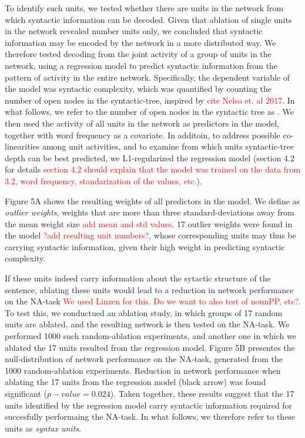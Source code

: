 To identify such units, we tested whether there are units in the network from which syntactic information can be decoded. Given that ablation of single units in the network revealed number units only, we concluded that syntactic information may be encoded by the network in a more distributed way. We therefore tested decoding from the joint activity of a group of units in the network, using a regression model to predict syntactic information from the pattern of activity in the entire network. Specifically, the dependent variable of the model was syntactic complexity, which was quantified by counting the number of open nodes in the syntactic-tree, inspired by \textcolor{red}{cite Nelso et. al 2017}. In what follows, we refer to the number of open nodes in the syntactic tree as . We then used the activity of all units in the network as predictors in the model, together with word frequency as a covariate. In additoin, to address possible co-linearities among unit activities, and to examine from which units syntactic-tree depth can be best predicted, we L1-regularized the regression model (section 4.2 for details \textcolor{red}{section 4.2 should explain that the model was trained on the data from 3.2, word frequency, standarization of the values, etc.}). 

Figure 5A shows the resulting weights of all predictors in the model. We define as \textit{outlier weights}, weights that are more than three standard-deviations away from the mean weight size \textcolor{red}{add mean and std values}. 17 outlier weights were found in the model \textcolor{red}{?add resulting unit numbers?}, whose corresponding units may thus be carrying syntactic information, given their high weight in predicting syntactic complexity. 

If these units indeed carry information about the sytactic structure of the sentence, ablating these units would lead to a reduction in network performance on the NA-task \textcolor{red}{We used Linzen for this. Do we want to also test of nounPP, etc?}. To test this, we conductued an ablation study, in which groups of 17 random units are ablated, and the resulting network is then tested on the NA-task. We performed 1000 such random-ablation experiments, and another one in which we ablated the 17 units resulted from the regression model. Figure 5B presentes the null-distribution of network performance on the NA-task, generated from the 1000 random-ablation experiments. Reduction in network performance when ablating the 17 units from the regression model (black arrow) was found significant ($p-value=0.024$). Taken together, these results suggest that the 17 units identified by the regression model carry syntactic information required for succesfully performaing the NA-task. In what follows, we therefore refer to these units as \textit{syntax units}.

